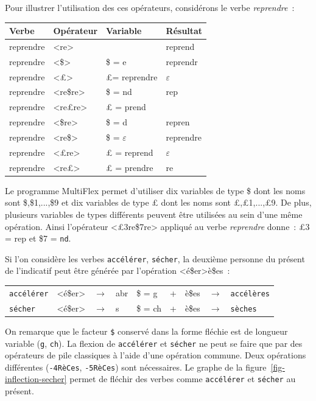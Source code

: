 \bigskip
\noindent
Pour illustrer l'utilisation des ces opérateurs, considérons le verbe {\it reprendre}~:

\bigskip
\begin{center}
\begin{tabular}{|l|l|l|l|}
\hline
Verbe     & Opérateur & Variable & Résultat\\
\hline
\hline
reprendre & <re> & & reprend\\
reprendre & <\$> & \$ = e & reprendr\\
reprendre & <{\pounds}> &{\pounds}= reprendre & $\varepsilon$ \\
reprendre & <re\$re> & \$ = nd & rep\\
reprendre & <re{\pounds}re> & {\pounds} = prend & \\
reprendre & <\$re> & \$ = d & repren\\
reprendre & <re\$> & \$ =  $\varepsilon$ & reprendre\\
reprendre & <{\pounds}re> & {\pounds} = reprend & $\varepsilon$\\
reprendre & <re{\pounds}> & {\pounds} = prendre & re\\
\hline
\end{tabular}
\end{center}

\bigskip
\noindent
Le programme MultiFlex permet d'utiliser dix variables de type \$ dont les noms sont \$,\$1,...,\$9
et dix variables de type {\pounds} dont les noms sont {\pounds},{\pounds}1,...,{\pounds}9. De plus,
plusieurs variables de types différents peuvent \^etre utilisées au sein d'une m\^eme opération.
Ainsi l'opérateur <{\pounds}3re\$7re> appliqué au verbe {\it reprendre} donne~: {\pounds}3 = 
 rep et \$7 = \verb+nd+.

\bigskip
\noindent
Si l'on considère les verbes \verb+accélérer+, \verb+sécher+, la
deuxième personne du présent de l'indicatif peut \^etre générée par l'opération <é\$er>è\$es~:

\begin{center}
\begin{tabular}{lllllllll}
	\verb+accélérer+ & <é\$er> & $\rightarrow$ & abr & \$ = g & + & è\$es &  $\rightarrow$ & \verb+accélères+\\
	\verb+sécher+ & <é\$er> & $\rightarrow$ & s & \$ = ch & + & è\$es & $\rightarrow$ & \verb+sèches+\\
\end{tabular}
\end{center}

\noindent
On remarque que le facteur \verb+$+ conservé dans la forme fléchie est de longueur variable (\verb+g+, \verb+ch+). 
La flexion de \verb+accélérer+ et \verb+sécher+ ne peut se faire que par des opérateurs de pile
classiques \`a l'aide d'une opération commune. Deux opérations différentes (\verb+-4RèCes+, \verb+-5RèCes+) sont
nécessaires. Le graphe de la figure~\ref{fig-inflection-secher} permet de fléchir des verbes comme
\verb+accélérer+ et \verb+sécher+ au présent.


